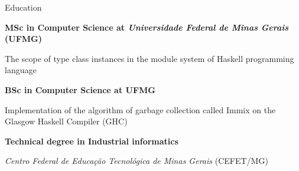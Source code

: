 \begin {rubric} {Education}

\entry* [2012]
\textbf{MSc in Computer Science at \emph{Universidade Federal de Minas Gerais} (UFMG)}

The scope of type class instances in the module system of Haskell
programming language

\entry* [2010]
\textbf{BSc in Computer Science at UFMG}

Implementation of the algorithm of garbage collection called Immix on the
Glasgow Haskell Compiler (GHC)

\entry* [2003]
\textbf {Technical degree in Industrial informatics}

\emph{Centro Federal de Educação Tecnológica de Minas Gerais} (CEFET/MG)
\end {rubric}
